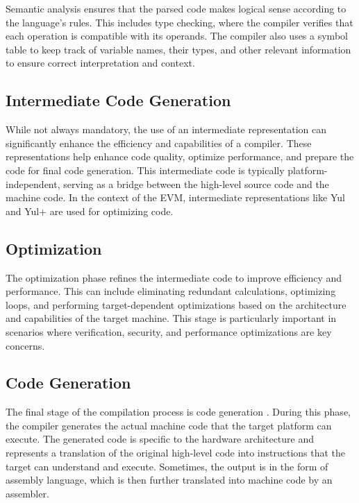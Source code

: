 Semantic analysis ensures that the parsed code makes logical sense according to the language's rules. This includes type checking, where the compiler verifies that each operation is compatible with its operands. The compiler also uses a symbol table to keep track of variable names, their types, and other relevant information to ensure correct interpretation and context.

\subsection{Intermediate Code Generation}

While not always mandatory, the use of an intermediate representation can significantly enhance the efficiency and capabilities of a compiler. These representations help enhance code quality, optimize performance, and prepare the code for final code generation. This intermediate code is typically platform-independent, serving as a bridge between the high-level source code and the machine code. In the context of the EVM, intermediate representations like Yul and Yul+ are used for optimizing code.

\subsection{Optimization}

The optimization phase refines the intermediate code to improve efficiency and performance. This can include eliminating redundant calculations, optimizing loops, and performing target-dependent optimizations based on the architecture and capabilities of the target machine. This stage is particularly important in scenarios where verification, security, and performance optimizations are key concerns.

\subsection{Code Generation}

The final stage of the compilation process is code generation \cite[253-281]{CompilerConstruction}. During this phase, the compiler generates the actual machine code that the target platform can execute. The generated code is specific to the hardware architecture and represents a translation of the original high-level code into instructions that the target can understand and execute. Sometimes, the output is in the form of assembly language, which is then further translated into machine code by an assembler.\\



